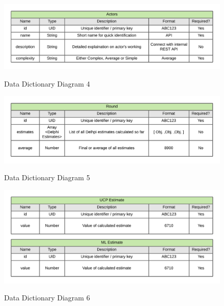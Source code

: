 \begin{figure}[H]
    \centering
    \caption{Data Dictionary Diagram 4}
    \includegraphics[scale=0.7]{./diagrams/data-dictionary/dd-4.png}
    \label{fig:dd-diag-4}

\end{figure}


\begin{figure}[H]
    \centering
    \caption{Data Dictionary Diagram 5}
    \includegraphics[scale=0.7]{./diagrams/data-dictionary/dd-5.png}
    \label{fig:dd-diag-5}

\end{figure}



\begin{figure}[H]
    \centering
    \caption{Data Dictionary Diagram 6}
    \includegraphics[scale=0.7]{./diagrams/data-dictionary/dd-6.png}
    \label{fig:dd-diag-6}
\end{figure}